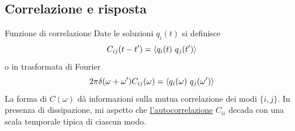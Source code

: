 \documentclass[10pt]{beamer}
\begin{document}
\subsection{Correlazione e risposta}

%  


\begin{frame}{Funzione di correlazione}
 Date le soluzioni $q_i(t)$ si definisce
 \begin{equation*}
   C_{ij} (t-t') = \mean{q_i(t)\ q_j(t')}
 \end{equation*}
 o in trasformata di Fourier
 \begin{equation*}
   2\pi \delta (\omega + \omega') C_{ij}(\omega) = \left \langle q_i(\omega)\ q_j(\omega') \right \rangle
 \end{equation*}
La forma di $C(\omega)$ dà informazioni sulla mutua correlazione dei modi $\{i,j\}$. In presenza di dissipazione, mi aspetto che \underline{l'autocorrelazione} $C_{ii}$ decada con una scala temporale tipica di ciascun modo.

\end{frame}
\end{document}

